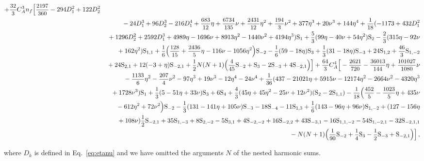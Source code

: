\documentclass[
 twocolumn,
 superscriptaddress,
 preprintnumbers,
 nofootinbib,
 amsmath,amssymb,
 aps,
 prl
 ]{revtex4-2}
\newcommand\HS{\mathrm{S}}
\def\D#1{D_#1}
\def\frct#1#2{\mbox{\small{$\displaystyle\frac{#1}{#2}$}}}
\begin{document}
\begin{widetext}
\begin{eqnarray}
+\frct{32}{3}\*C_A^3\*n_f\*\Big[
\frct{2197}{360}
-294\*\D1^2
+122\*\D2^2
\nonumber\\
&&{}
-24\*\D1^3
+96\*\D2^3
-216\*\D1^4
+\frct{683}{12}\*\eta
+\frct{6734}{135}\*\nu
+\frct{2431}{12}\*\eta^2
+\frct{194}{3}\*\nu^2
+377\*\eta^3
+20\*\nu^3
+144\*\eta^4
+\frct{1}{18}\*(
-1173
+432\*\D1^2
\nonumber\\
&&{}
+1296\*\D2^2
+2592\*\D1^3
+4989\*\eta
-1696\*\nu
+8913\*\eta^2
-1440\*\nu^2
+4194\*\eta^3
)\*\HS_{1}
+\frct{5}{3}\*(99\*\eta
-40\*\nu
+54\*\eta^2
)\*\HS_{2}
-\frct{2}{3}\*(
315\*\eta
-92\*\nu
\nonumber\\
&&{}
+162\*\eta^2
)\*\HS_{1,1}
+\frct{1}{6}\*\Big(
\frct{128}{15}
+\frct{2436}{5}\*\eta
-116\*\nu
-1056\*\eta^2
\Big)\*\HS_{-2}
-\frct{1}{6}\*(
59
-18\*\eta)\*\HS_{3}
+\frct{1}{3}\*(31
-18\*\eta)\*\HS_{-3}
+24\*\HS_{1,2}
+\frct{46}{3}\*\HS_{1,-2}
\nonumber\\
&&{}
+24\*\HS_{2,1}
+12\*(
-3
+\eta)\*\HS_{-2,1}
+\frct{1}{2}\*N\*(N+1)\*\Big(
\frct{4}{45}\*\HS_{-2}
+\HS_{3}
-2\*\HS_{-3}
+4\*\HS_{-2,1}\Big)\Big]

+\frct{64}{3}\*C_A^4\*\Big[
-\frct{2621}{720}
-\frct{36013}{144}\*\eta
+\frct{101027}{1080}\*\nu
\nonumber\\
&&{}
-\frct{1133}{6}\*\eta^2
-\frct{207}{4}\*\nu^2
-97\*\eta^3
+19\*\nu^3
-12\*\eta^4
-24\*\nu^4
+\frct{1}{36}\*(437
-21021\*\eta
+5915\*\nu
-12174\*\eta^2
-2664\*\nu^2
-4320\*\eta^3
\nonumber\\
&&{}
+1728\*\nu^3)\*\HS_{1}
+\frct{1}{3}\*(5
-51\*\eta
+33\*\nu)\*\HS_{3}
+6\*\HS_{4}
+\frct{4}{3}\*(45\*\eta
+45\*\eta^2
-25\*\nu
+12\*\nu^2)\*(\HS_{2}-2\*\HS_{1,1})
-\frct{1}{18}\*\Big(
\frct{452}{5}
-\frct{1023}{5}\*\eta
+435\*\nu
\nonumber\\
&&{}
-612\*\eta^2
+72\*\nu^2
\Big)\*\HS_{-2}
-\frct{1}{3}\*(
131
-141\*\eta
+105\*\nu)\*\HS_{-3}
-18\*\HS_{-4}
-11\*\HS_{1,3}
+\frct{1}{6}\*(143
-96\*\eta
+96\*\nu)\*\HS_{1,-2}
+(127
-156\*\eta
\nonumber\\
&&{}
+108\*\nu)\*\frct{1}{2}\*\HS_{-2,1}
+35\*\HS_{1,-3}
+8\*\HS_{2,-2}
-5\*\HS_{3,1}
+4\*\HS_{-2,-2}
+16\*\HS_{-2,2}
+43\*\HS_{-3,1}
-16\*\HS_{1,1,-2}
-54\*\HS_{1,-2,1}
-32\*\HS_{-2,1,1}
\nonumber\\
&&{}
-N\*(N+1)\*\Big(
\frct{1}{90}\*\HS_{-2}
+\frct{1}{4}\*\HS_{3}
-\frct{1}{2}\*\HS_{-3}
+\HS_{-2,1}
\Big)
\Big]


\,,
\label{eq:quadratic}
\end{eqnarray}
\end{widetext}
where $D_k$ is defined in Eq.~\eqref{eq:etanu} and we have omitted the arguments $N$ of the nested harmonic sums.
\end{document}
